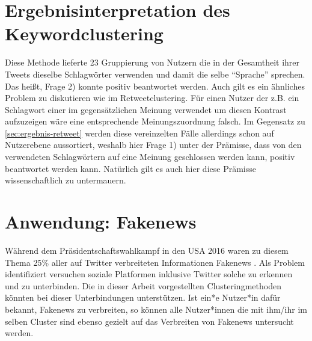 \section{Ergebnisinterpretation des Keywordclustering}
Diese Methode lieferte 23 Gruppierung von Nutzern die in der Gesamtheit ihrer Tweets dieselbe Schlagwörter verwenden und damit die selbe "`Sprache"' sprechen. Das heißt, Frage 2) konnte positiv beantwortet werden. Auch gilt es  ein ähnliches Problem zu diskutieren wie im Retweetclustering.
Für einen Nutzer der z.B. ein Schlagwort einer im gegensätzlichen Meinung verwendet um diesen Kontrast aufzuzeigen wäre eine entsprechende Meinungszuordnung falsch.
Im Gegensatz zu \ref{sec:ergebnis-retweet} werden diese vereinzelten Fälle allerdings schon auf Nutzerebene aussortiert, weshalb hier Frage 1) unter der Prämisse, dass von den verwendeten Schlagwörtern auf eine Meinung geschlossen werden kann, positiv beantwortet werden kann.
Natürlich gilt es auch hier diese Prämisse wissenschaftlich zu untermauern.

\section{Anwendung: Fakenews}
Während dem Präsidentschaftswahlkampf in den USA 2016 waren zu diesem Thema 25\% aller auf Twitter verbreiteten Informationen \gls{Fakenews} \cite{fake-news}.
Als Problem identifiziert versuchen soziale Platformen inklusive Twitter solche zu erkennen und zu unterbinden. 
Die in dieser Arbeit vorgestellten Clusteringmethoden könnten bei dieser Unterbindungen unterstützen. Ist ein*e Nutzer*in dafür bekannt, Fakenews zu verbreiten, so können alle Nutzer*innen die mit ihm/ihr im selben Cluster sind ebenso gezielt auf das Verbreiten von Fakenews untersucht werden.